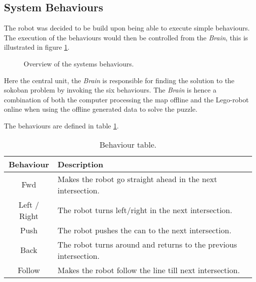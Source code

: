 \subsection{System Behaviours}
The robot was decided to be build upon being able to execute simple behaviours.
The execution of the behaviours would then be controlled from the \textit{Brain},
this is illustrated in figure \ref{fig:behaviourSystem}.

\begin{figure}[H]
\center
{}
\caption{Overview of the systems behaviours.}
\label{fig:behaviourSystem}
\end{figure}

Here the central unit, the \textit{Brain} is responsible for finding the solution to the sokoban problem by invoking the six behaviours.
The \textit{Brain} is hence a combination of both the computer processing the map offline and the Lego-robot online when using the offline generated data to solve the puzzle.

The behaviours are defined in table \ref{tab:behaviourExplained}.
\begin{table}[H]
\center
\begin{tabular}{c|l}
Behaviour & Description \\ \hline
Fwd & Makes the robot go straight ahead in the next intersection. \\
Left / Right & The robot turns left/right in the next intersection. \\
Push & The robot pushes the can to the next intersection. \\
Back & The robot turns around and returns to the previous intersection. \\
Follow & Makes the robot follow the line till next intersection.
\end{tabular}
\caption{Behaviour table.}
\label{tab:behaviourExplained}
\end{table}

